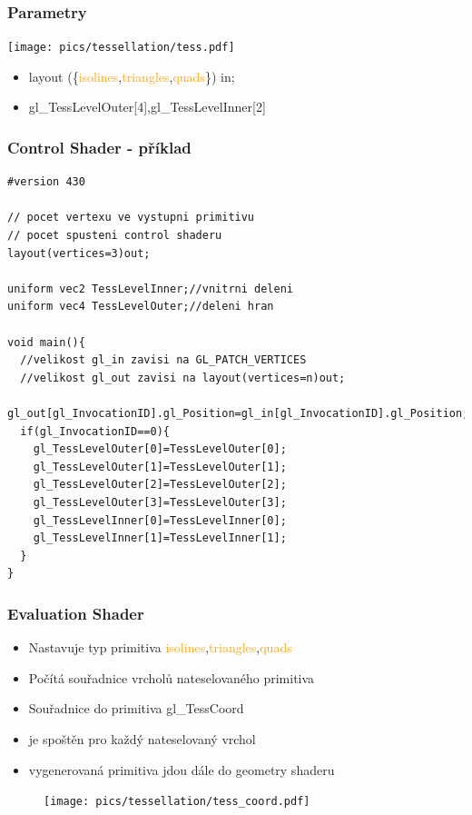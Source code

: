 \begin{frame}
    \frametitle{Parametry}

    \texttt{[image: pics/tessellation/tess.pdf]}

    \begin{itemize}
				\item \textcolor{OliveGreen}{layout}
					(\{\textcolor{orange}{isolines},\textcolor{orange}{triangles},\textcolor{orange}{quads}\})
					\textcolor{OliveGreen}{in};
				\item \textcolor{OliveGreen}{gl\_TessLevelOuter}[4],\textcolor{OliveGreen}{gl\_TessLevelInner}[2]
    \end{itemize}
\end{frame}

\begin{frame}[fragile]
\frametitle{Control Shader - příklad}
	{\scriptsize
	\begin{verbatim}
#version 430

// pocet vertexu ve vystupni primitivu
// pocet spusteni control shaderu
layout(vertices=3)out;

uniform vec2 TessLevelInner;//vnitrni deleni
uniform vec4 TessLevelOuter;//deleni hran

void main(){
  //velikost gl_in zavisi na GL_PATCH_VERTICES
  //velikost gl_out zavisi na layout(vertices=n)out;
  gl_out[gl_InvocationID].gl_Position=gl_in[gl_InvocationID].gl_Position;
  if(gl_InvocationID==0){
    gl_TessLevelOuter[0]=TessLevelOuter[0];
    gl_TessLevelOuter[1]=TessLevelOuter[1];
    gl_TessLevelOuter[2]=TessLevelOuter[2];
    gl_TessLevelOuter[3]=TessLevelOuter[3];
    gl_TessLevelInner[0]=TessLevelInner[0];
    gl_TessLevelInner[1]=TessLevelInner[1];
  }
}
	\end{verbatim}
	}
\end{frame}

\begin{frame}
\frametitle{Evaluation Shader}
	\begin{itemize}
		\item Nastavuje typ primitiva \textcolor{Orange}{isolines},\textcolor{orange}{triangles},\textcolor{orange}{quads}
		\item Počítá souřadnice vrcholů nateselovaného primitiva
		\item Souřadnice do primitiva \textcolor{OliveGreen}{gl\_TessCoord}
		\item je spoštěn pro každý nateselovaný vrchol
		\item vygenerovaná primitiva jdou dále do geometry shaderu
	\end{itemize}
	\begin{figure}[h]
	\texttt{[image: pics/tessellation/tess\_coord.pdf]}
	\end{figure}
\end{frame}


